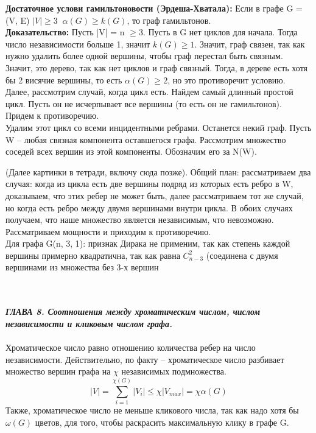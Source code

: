 \documentclass[12pt]{article}
\begin{document}
\textbf{Достаточное услови гамильтоновости (Эрдеша-Хватала):} Если в графе G = (V, E) \(|V| \geq 3 \;\;\alpha(G) \geq k(G)\), то граф гамильтонов.\\

\textbf{Доказательство:} Пусть |V| = n \(\geq3\).
Пусть в G нет циклов для начала. Тогда число независимости больше 1, значит \(k(G) \geq 1\). Значит, граф связен, так как нужно удалить более одной вершины, чтобы граф перестал быть связным. Значит, это дерево, так как нет циклов и граф связный. Тогда, в дереве есть хотя бы 2 висячие вершины, то есть \(\alpha(G) \geq 2\), но это противоречит условию.\\

Далее, рассмотрим случай, когда цикл есть. Найдем самый длинный простой цикл. Пусть он не исчерпывает все вершины (то есть он не гамильтонов). Придем к противоречию.\\

Удалим этот цикл со всеми инцидентными ребрами. Останется некий граф. Пусть W -- любая связная компонента оставшегося графа. Рассмотрим множество соседей всех вершин из этой компоненты. Обозначим его за N(W).

(Далее картинки в тетради, включу сюда позже). Общий план: рассматриваем два случая: когда из цикла есть две вершины подряд из которых есть ребро в W, доказываем, что этих ребер не может быть, далее рассматриваем тот же случай, но когда есть ребро между двумя вершинами внутри цикла. В обоих случаях получаем, что наше множество является независимым, что невозможно. Рассматриваем мощности и приходим к противоречию.
\\

Для графа G(n, 3, 1): признак Дирака не применим, так как степень каждой вершины примерно квадратична, так как равна \(C_{n-3}^2\) (соединена с двумя вершинами из множества без 3-х вершин

\\
\newpage
\\
\textbf{\textit{ГЛАВА 8. Соотношения между хроматическим числом, числом независимости и кликовым числом графа.}}
\\
\\

Хроматическое число равно отношению количества ребер на число независимости. Действительно, по факту -- хроматическое число разбивает множество вершин графа на \(\chi\) независимых подмножества. 
$$ |V| = \sum_{i = 1}^{\chi(G)}|V_{i}| \leq  \chi |V_{max}| = \chi \alpha(G)$$
Также, хроматическое число не меньше кликового числа, так как надо хотя бы \(\omega(G)\) цветов, для того, чтобы раскрасить максимальную клику в графе G.
\\
\newpage
\\
\end{document}
